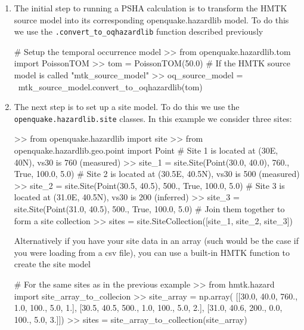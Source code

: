\begin{enumerate}

\item The initial step to running a PSHA calculation is to transform the HMTK source model into its corresponding openquake.hazardlib model. To do this we use the \verb=.convert_to_oqhazardlib= function described previously

\begin{python}[frame=single]
# Setup the temporal occurrence model
>> from openquake.hazardlib.tom import PoissonTOM
>> tom = PoissonTOM(50.0)
# If the HMTK source model is called "mtk_source_model"
>> oq_source_model = \
    mtk_source_model.convert_to_oqhazardlib(tom)
\end{python}

\item The next step is to set up a site model. To do this we use the \\ \verb=openquake.hazardlib.site= classes. In this example we consider three sites:

\begin{python}[frame=single]
>> from openquake.hazardlib import site
>> from openquake.hazardlib.geo.point import Point
# Site 1 is located at (30E, 40N), vs30 is 760 (measured)
>> site_1 = site.Site(Point(30.0, 40.0), 
                      760.,
                      True,
                      100.0,
                      5.0)
# Site 2 is located at (30.5E, 40.5N), vs30 is 500 (measured)
>> site_2 = site.Site(Point(30.5, 40.5),
                      500.,
                      True,
                      100.0,
                      5.0)
# Site 3 is located at (31.0E, 40.5N), vs30 is 200 (inferred)
>> site_3 = site.Site(Point(31.0, 40.5),
                      500.,
                      True,
                      100.0,
                      5.0)
# Join them together to form a site collection
>> sites = site.SiteCollection([site_1, site_2, site_3])
\end{python}

Alternatively if you have your site data in an array (such would be the case if you were loading from a csv file), you can use a built-in HMTK function to create the site model

\begin{python}[frame=single]
# For the same sites as in the previous example
>> from hmtk.hazard import site_array_to_collecion
>> site_array = np.array(
    [[30.0, 40.0, 760., 1.0, 100., 5.0, 1.],
     [30.5, 40.5, 500., 1.0, 100., 5.0, 2.],
     [31.0, 40.6, 200., 0.0, 100., 5.0, 3.]])
>> sites = site_array_to_collection(site_array)
\end{python}


\end{enumerate}
